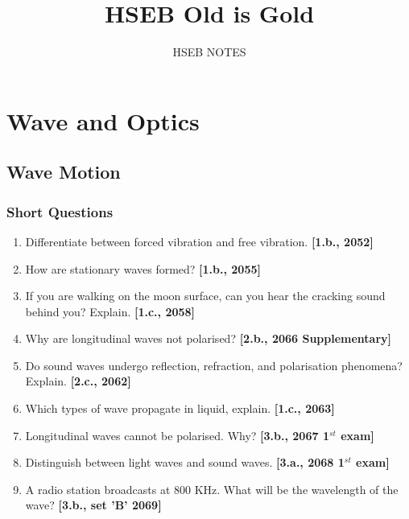 \documentclass[a4paper,10pt]{report}
\title{HSEB Old is Gold}
\author{HSEB NOTES}
\begin{document}
\maketitle

\begin{abstract}
\end{abstract}

\chapter{Wave and Optics}

\section{Wave Motion}
 \subsection{Short Questions}
  \begin{enumerate}
   \item Differentiate between forced vibration and free vibration. \textbf{[1.b., 2052]}
   \item How are stationary waves formed? \textbf{[1.b., 2055]}
   \item If you are walking on the moon surface, can you hear the cracking sound behind you? Explain. 
    \textbf{[1.c., 2058]}
   \item Why are longitudinal waves not polarised? \textbf{[2.b., 2066 Supplementary]}
   \item Do sound waves undergo reflection, refraction, and polarisation phenomena? Explain. 
    \textbf{[2.c., 2062]}
   \item Which types of wave propagate in liquid, explain. \textbf{[1.c., 2063]}
   \item Longitudinal waves cannot be polarised. Why? \textbf{[3.b., 2067 1$^{st}$ exam]}
   \item Distinguish between light waves and sound waves. \textbf{[3.a., 2068 1$^{st}$ exam]}
   \item A radio station broadcasts at 800 KHz. What will be the wavelength of the wave? 
    \textbf{[3.b., set 'B' 2069]}
  \end{enumerate}
\end{document}
